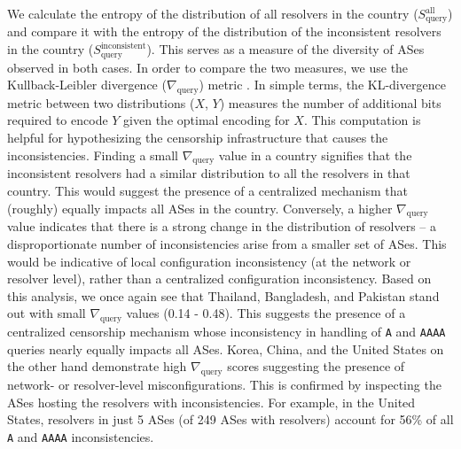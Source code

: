 We calculate the entropy of the distribution of all resolvers in the
country ($S_{\text{query}}^{\text{all}}$) and compare it with the entropy of
the distribution of the inconsistent resolvers in the country
($S_{\text{query}}^{\text{inconsistent}}$). This serves as a measure of the
diversity of ASes observed in both cases. 
%
In order to compare the two measures, we use the Kullback-Leibler divergence
($\nabla_{\text{query}}$) metric \cite{KLdivergence}. In simple terms, the
KL-divergence metric between two distributions ($X$, $Y$) measures the number
of additional bits required to encode $Y$ given the optimal encoding for $X$.
%
This computation is helpful for hypothesizing the censorship infrastructure
that causes the inconsistencies. Finding a small $\nabla_{\text{query}}$ value
in a country signifies that the inconsistent resolvers had a similar
distribution to all the resolvers in that country. This would suggest the
presence of a centralized mechanism that (roughly) equally impacts all ASes in
the country. 
Conversely, a higher $\nabla_{\text{query}}$ value indicates that there is
a strong change in the distribution of resolvers -- \ie a disproportionate
number of inconsistencies arise from a smaller set of ASes. This would be
indicative of local configuration inconsistency (at the network or resolver
level), rather than a centralized configuration inconsistency.
%
Based on this analysis, we once again see that Thailand, Bangladesh, and
Pakistan stand out with small $\nabla_{\text{query}}$ values (0.14 - 0.48).
This suggests the presence of a centralized censorship mechanism whose
inconsistency in handling of {\tt A} and {\tt AAAA} queries nearly equally
impacts all ASes. 
%
Korea, China, and the United States on the other hand demonstrate high
$\nabla_{\text{query}}$ scores suggesting the presence of network- or
resolver-level misconfigurations. This is confirmed by inspecting the ASes
hosting the resolvers with inconsistencies. For example, in the United States,
resolvers in just 5 ASes (of 249 ASes with resolvers) account for 56\% of all
{\tt A} and {\tt AAAA} inconsistencies.


